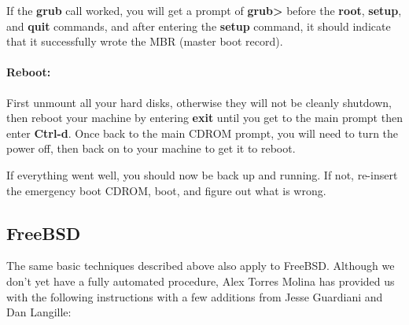 If the {\bf grub} call worked, you will get a prompt of {\bf grub{\textgreater}}
before the {\bf root}, {\bf setup}, and {\bf quit} commands, and after
entering the {\bf setup} command, it should indicate that it successfully
wrote the MBR (master boot record).


\paragraph*{Reboot:}

First unmount all your hard disks, otherwise they will not be cleanly
shutdown, then reboot your machine by entering {\bf exit} until you get to the
main prompt then enter {\bf Ctrl-d}. Once back to the main CDROM prompt, you
will need to turn the power off, then back on to your machine to get it to
reboot.

If everything went well, you should now be back up and running. If not,
re-insert the emergency boot CDROM, boot, and figure out what is wrong.


\subsection{FreeBSD}
\label{FreeBSD1}

The same basic techniques described above also apply to FreeBSD. Although we
don't yet have a fully automated procedure, Alex Torres Molina has provided us
with the following instructions with a few additions from Jesse Guardiani and
Dan Langille:

